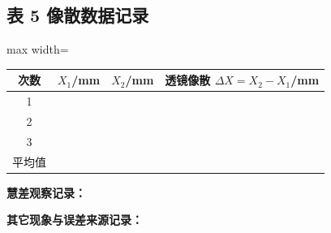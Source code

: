 \documentclass[12pt, a4paper]{article}
\begin{document}
\subsection*{表 5 \quad 像散数据记录}
\begin{table}[H]
  \centering
  \begin{adjustbox}{max width=\textwidth}
    \begin{tabular}{cccc}
      \toprule
      次数 & $X_1$/mm & $X_2$/mm & 透镜像散 $\Delta X=X_2-X_1$/mm \\
      \midrule
      1 & & & \\
      2 & & & \\
      3 & & & \\
      \midrule
      平均值 & & & \\
      \bottomrule
    \end{tabular}
  \end{adjustbox}
\end{table}

\noindent\textbf{慧差观察记录：}

\vspace{2cm}

\noindent\textbf{其它现象与误差来源记录：}

\vspace{2cm}
\end{document}
